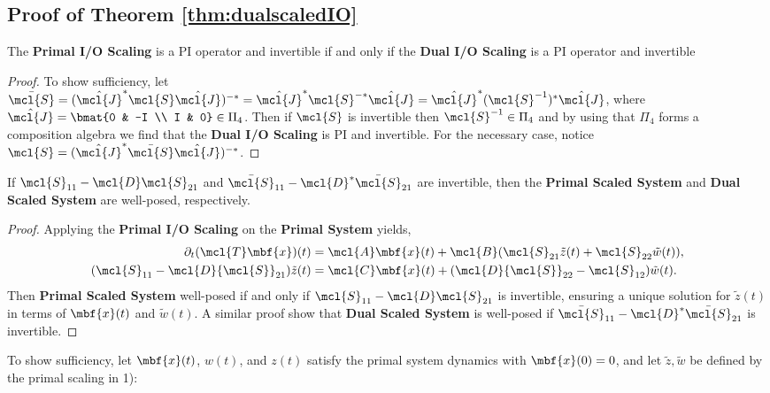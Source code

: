 \subsection{Proof of Theorem \ref{thm:dualscaledIO}}\label{proof:theorem2}
    

\begin{sublemma}\label{lem:scalingisPI}
    The \textbf{Primal I/O Scaling} is a PI operator and invertible if and only if the \textbf{Dual I/O Scaling} is a PI operator and invertible
\end{sublemma}
\begin{proof}
    To show sufficiency, let $\bar{\mcl{S}} = (\hat{\mcl{J}}^*\mcl{S}\hat{\mcl{J}})^{-*} = \hat{\mcl{J}}^*\mcl{S}^{-*}\hat{\mcl{J}} = \hat{\mcl{J}}^*(\mcl{S}^{-1})^{*}\hat{\mcl{J}}$, where $\hat{\mcl{J}} = \bmat{0 & -I \\ I & 0} \in \Pi_4$. Then if $\mcl{S}$ is invertible then $\mcl{S}^{-1} \in \Pi_4$ and by using that $\Pi_4$ forms a composition algebra we find that the \textbf{Dual I/O Scaling} is PI and invertible. For the necessary case, notice $\mcl{S} = (\hat{\mcl{J}}^*\bar{\mcl{S}}\hat{\mcl{J}})^{-*}$. 
\end{proof}
\begin{sublemma}
    If $\mcl{S}_{11} - \mcl{D}\mcl{S}_{21}$ and $\bar{\mcl{S}}_{11} - \mcl{D}^*\bar{\mcl{S}}_{21}$ are invertible, then the \textbf{Primal Scaled System} and \textbf{Dual Scaled System} are well-posed, respectively.
\end{sublemma}
\begin{proof}
    Applying the \textbf{Primal I/O Scaling} on the \textbf{Primal System} yields,
\[
\begin{aligned}
\partial_t(\mcl{T}\mbf{x})(t) &= \mcl{A}\mbf{x}(t) + \mcl{B}({\mcl{S}}_{21}\tilde{z}(t) + {\mcl{S}}_{22}\tilde{w}(t)), \\
({\mcl{S}}_{11} - \mcl{D}{\mcl{S}}_{21}) \tilde{z}(t) &= \mcl{C} \mbf{x}(t) + (\mcl{D}{\mcl{S}}_{22} - {\mcl{S}}_{12}) \tilde{w}(t).
\end{aligned}
\]
Then \textbf{Primal Scaled System} well-posed if and only if \( \mcl{S}_{11} - \mcl{D}\mcl{S}_{21} \) is invertible, ensuring a unique solution for \( \tilde{z}(t) \) in terms of \( \mbf{x}(t) \) and \( \tilde{w}(t) \). A similar proof show that \textbf{Dual Scaled System} is well-posed if $\bar{\mcl{S}}_{11} - \mcl{D}^*\bar{\mcl{S}}_{21}$ is invertible.
\end{proof}
    To show sufficiency, let $\mbf{x}(t)$, $w(t)$, and $z(t)$ satisfy the primal system dynamics with $\mbf{x}(0)=0$, and let $\tilde{z}, \tilde{w}$ be defined by the primal scaling in 1):
